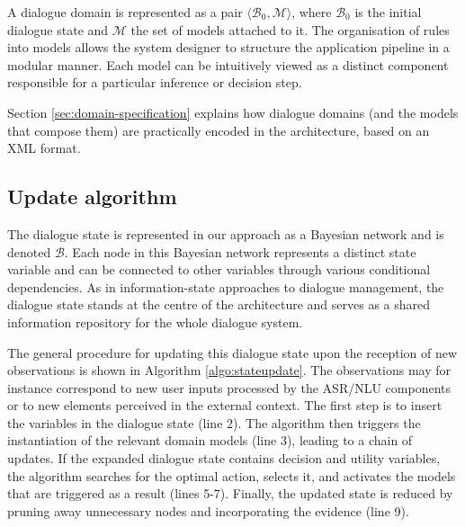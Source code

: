 A dialogue domain is represented as a pair $\langle \mathcal{B}_0, \mathcal{M} \rangle$, where $\mathcal{B}_0$ is the initial dialogue state  and $\mathcal{M}$ the set of models attached to it. The organisation of rules into models allows the system designer to structure the application pipeline in a modular manner. Each model can be intuitively viewed as a distinct component responsible for a particular inference or decision step. 

Section \ref{sec:domain-specification} explains how dialogue domains (and the models that compose them) are practically encoded in the \opendial{} architecture, based on an XML format. 

\subsection{Update algorithm} 


The dialogue state is represented in our approach as a Bayesian network and is denoted $\mathcal{B}$. Each node in this Bayesian network represents a distinct state variable and can be connected to other variables through various conditional dependencies. As in information-state approaches to dialogue management, the dialogue state stands at the centre of the architecture and serves as a shared information repository for the whole dialogue system. 

The general procedure for updating this dialogue state upon the reception of new observations is shown in Algorithm \ref{algo:stateupdate}. The observations may for instance correspond to new user inputs processed by the ASR/NLU components or to new elements perceived in the external context. The first step is to insert the variables in the dialogue state (line 2). The algorithm then triggers the instantiation of the relevant domain models (line 3), leading to a chain of updates.  If the expanded dialogue state contains decision and utility variables, the algorithm searches for the optimal action, selects it, and activates the models that are triggered as a result  (lines 5-7). Finally, the updated state is reduced by pruning away unnecessary nodes and incorporating the evidence (line 9). 

